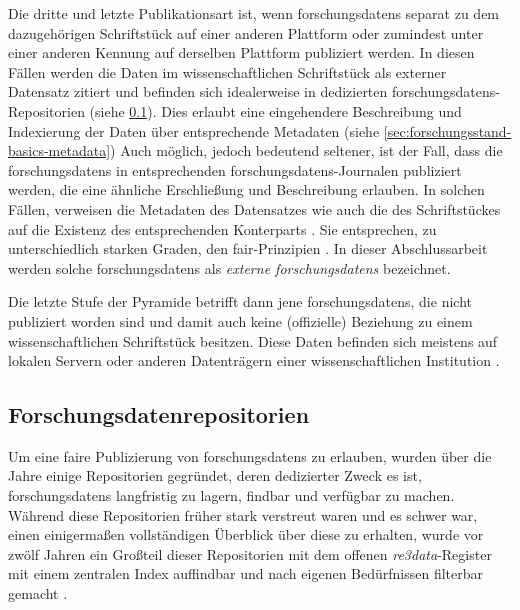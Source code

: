 Die dritte und letzte Publikationsart ist, wenn \glspl{forschungsdaten} separat zu dem dazugehörigen Schriftstück auf einer anderen Plattform oder zumindest unter einer anderen Kennung auf derselben Plattform publiziert werden.
In diesen Fällen werden die Daten im wissenschaftlichen Schriftstück als externer Datensatz zitiert und befinden sich idealerweise in dedizierten \glspl{forschungsdaten}-Repositorien (siehe \cref{sec:forschungsstand-basics-repositories}).
Dies erlaubt eine eingehendere Beschreibung und Indexierung der Daten über entsprechende Metadaten (siehe \cref{sec:forschungsstand-basics-metadata})
Auch möglich, jedoch bedeutend seltener, ist der Fall, dass die \glspl{forschungsdaten} in entsprechenden \glspl{forschungsdaten}-Journalen  publiziert werden, die eine ähnliche Erschließung und Beschreibung erlauben.
In solchen Fällen, verweisen die Metadaten des Datensatzes wie auch die des Schriftstückes auf die Existenz des entsprechenden Konterparts \autocite{ReillyEtAl2011}.
Sie entsprechen, zu unterschiedlich starken Graden, den \gls{fair}-Prinzipien \autocite[vgl.][]{ReillyEtAl2011}.
In dieser Abschlussarbeit werden solche \glspl{forschungsdaten} als \textit{externe \glspl{forschungsdaten}} bezeichnet.

Die letzte Stufe der Pyramide betrifft dann jene \glspl{forschungsdaten}, die nicht publiziert worden sind und damit auch keine (offizielle) Beziehung zu einem wissenschaftlichen Schriftstück besitzen.
Diese Daten befinden sich meistens auf lokalen Servern oder anderen Datenträgern einer wissenschaftlichen Institution \autocite{ReillyEtAl2011}.


\subsection{Forschungsdatenrepositorien}\label{sec:forschungsstand-basics-repositories}
Um eine \gls{fair}e Publizierung von \glspl{forschungsdaten} zu erlauben, wurden über die Jahre einige Repositorien gegründet, deren dedizierter Zweck es ist, \glspl{forschungsdaten} langfristig zu lagern, findbar und verfügbar zu machen.
Während diese Repositorien früher stark verstreut waren und es schwer war, einen einigermaßen vollständigen Überblick über diese zu erhalten, wurde vor zwölf Jahren ein Großteil dieser Repositorien mit dem offenen \textit{re3data}-Register mit einem zentralen Index auffindbar und nach eigenen Bedürfnissen filterbar gemacht \autocite{Pampel2013}.

